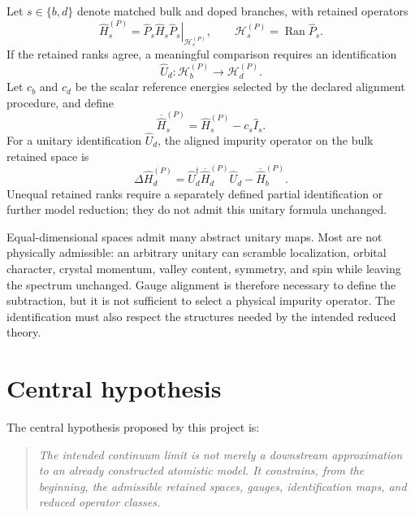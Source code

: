 Let $s\in\{b,d\}$ denote matched bulk and doped branches, with retained
operators
\begin{equation}
    \hat H_s^{(P)}
    =
    \left.
        \hat P_s\hat H_s\hat P_s
    \right|_{\mathcal H_s^{(P)}},
    \qquad
    \mathcal H_s^{(P)}
    =
    \operatorname{Ran}\hat P_s.
\end{equation}
If the retained ranks agree, a meaningful comparison requires an
identification
\begin{equation}
    \hat U_d:
    \mathcal H_b^{(P)}
    \longrightarrow
    \mathcal H_d^{(P)}.
\end{equation}
Let $c_b$ and $c_d$ be the scalar reference energies selected by the declared
alignment procedure, and define
\begin{equation}
    \overline{\hat H}_s^{(P)}
    =
    \hat H_s^{(P)}-c_s\hat I_s.
\end{equation}
For a unitary identification $\hat U_d$, the aligned impurity operator on the
bulk retained space is
\begin{equation}
    \Delta\hat H_d^{(P)}
    =
    \hat U_d^\dagger
    \overline{\hat H}_d^{(P)}
    \hat U_d
    -
    \overline{\hat H}_b^{(P)}.
\end{equation}
Unequal retained ranks require a separately defined partial identification or
further model reduction; they do not admit this unitary formula unchanged.

Equal-dimensional spaces admit many abstract unitary maps. Most are not
physically admissible: an arbitrary unitary can scramble localization, orbital
character, crystal momentum, valley content, symmetry, and spin while leaving
the spectrum unchanged. Gauge alignment is therefore necessary to define the
subtraction, but it is not sufficient to select a physical impurity operator.
The identification must also respect the structures needed by the intended
reduced theory.

\section{Central hypothesis}


The central hypothesis proposed by this project is:
\begin{quote}
\itshape
The intended continuum limit is not merely a downstream approximation to an
already constructed atomistic model. It constrains, from the beginning, the
admissible retained spaces, gauges, identification maps, and reduced operator
classes.
\end{quote}

